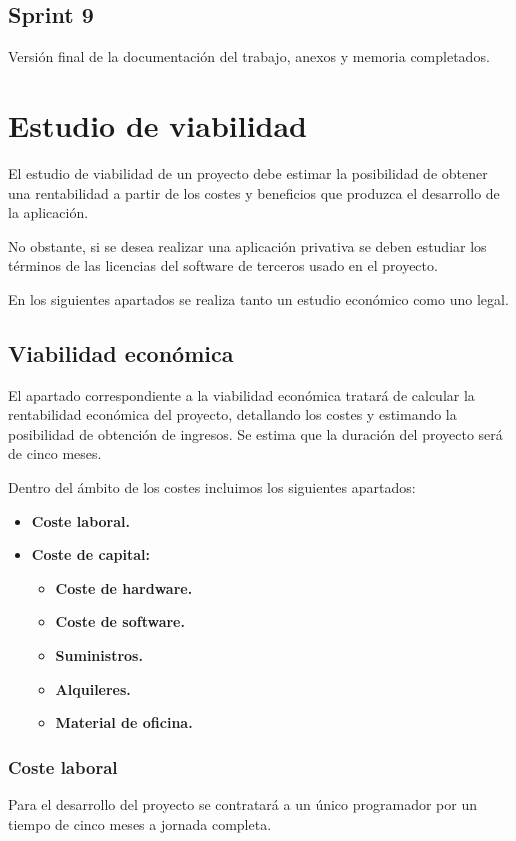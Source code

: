 \subsection{Sprint 9}
Versión final de la documentación del trabajo, anexos y memoria completados.

\section{Estudio de viabilidad}
El estudio de viabilidad de un proyecto debe estimar la posibilidad de obtener una rentabilidad a partir de los costes y beneficios que produzca el desarrollo de la aplicación.

No obstante, si se desea realizar una aplicación privativa se deben estudiar los términos de las licencias del software de terceros usado en el proyecto.

En los siguientes apartados se realiza tanto un estudio económico como uno legal.

\subsection{Viabilidad económica}
El apartado correspondiente a la viabilidad económica tratará de calcular la rentabilidad económica del proyecto, detallando los costes y estimando la posibilidad de obtención de ingresos. Se estima que la duración del proyecto será de cinco meses.

Dentro del ámbito de los costes incluimos los siguientes apartados:
\begin{itemize}
	\item \textbf{Coste laboral.}
	\item \textbf{Coste de capital:}
	\begin{itemize}
		\item \textbf{Coste de hardware.}
		\item \textbf{Coste de software.}
		\item \textbf{Suministros.}
		\item \textbf{Alquileres.}
		\item \textbf{Material de oficina.}
	\end{itemize}
\end{itemize}		
		
\subsubsection{Coste laboral}

Para el desarrollo del proyecto se contratará a un único programador por un tiempo de cinco meses a jornada completa.

